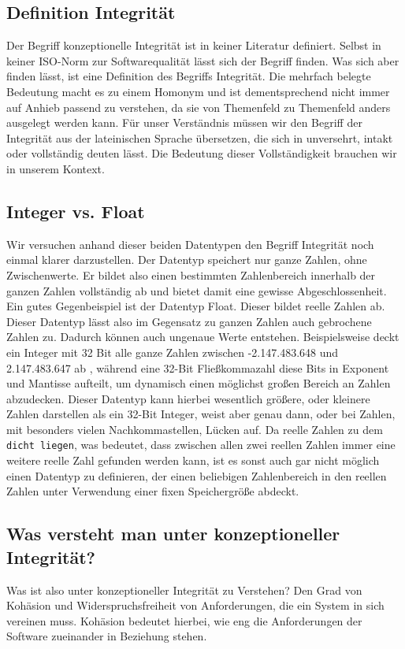 \documentclass[a4paper, ngerman, 12pt, usenames, dvipsnames]{article}
\begin{document}
\subsection{Definition Integrität}
Der Begriff konzeptionelle Integrität ist in keiner Literatur definiert. Selbst in keiner ISO-Norm zur Softwarequalität lässt sich der Begriff finden. Was sich aber finden lässt, ist eine Definition des Begriffs Integrität. Die mehrfach belegte Bedeutung macht es zu einem Homonym und ist dementsprechend nicht immer auf Anhieb passend zu verstehen, da sie von Themenfeld zu Themenfeld anders ausgelegt werden kann. Für unser Verständnis müssen wir den Begriff der Integrität aus der lateinischen Sprache übersetzen, die sich in unversehrt, intakt oder vollständig deuten lässt. Die Bedeutung dieser Vollständigkeit brauchen wir in unserem Kontext. 
\subsection{Integer vs. Float}
Wir versuchen anhand dieser beiden Datentypen den Begriff Integrität noch einmal klarer darzustellen. Der Datentyp speichert nur ganze Zahlen, ohne Zwischenwerte. Er bildet also einen bestimmten Zahlenbereich innerhalb der ganzen Zahlen vollständig ab und bietet damit eine gewisse Abgeschlossenheit. Ein gutes Gegenbeispiel ist der Datentyp Float. Dieser bildet reelle Zahlen ab. Dieser Datentyp lässt also im Gegensatz zu ganzen Zahlen auch gebrochene Zahlen zu. Dadurch können auch ungenaue Werte entstehen. Beispielsweise deckt ein Integer mit 32 Bit alle ganze Zahlen zwischen -2.147.483.648 und 2.147.483.647 ab \cite{dewiki:integer}, während eine 32-Bit Fließkommazahl diese Bits in Exponent und Mantisse aufteilt, um dynamisch einen möglichst großen Bereich an Zahlen abzudecken. Dieser Datentyp kann hierbei wesentlich größere, oder kleinere Zahlen darstellen als ein 32-Bit Integer, weist aber genau dann, oder bei Zahlen, mit besonders vielen Nachkommastellen, Lücken auf. \cite{dewiki:float} Da reelle Zahlen zu dem \texttt{dicht liegen}, was bedeutet, dass zwischen allen zwei reellen Zahlen immer eine weitere reelle Zahl gefunden werden kann, ist es sonst auch gar nicht möglich einen Datentyp zu definieren, der einen beliebigen Zahlenbereich in den reellen Zahlen unter Verwendung einer fixen Speichergröße abdeckt. 

\subsection{Was versteht man unter konzeptioneller Integrität?}
Was ist also unter konzeptioneller Integrität zu Verstehen?
Den Grad von Kohäsion und Widerspruchsfreiheit von Anforderungen, die ein System in sich vereinen muss. Kohäsion bedeutet hierbei, wie eng die Anforderungen der Software zueinander in Beziehung stehen.
\end{document}
